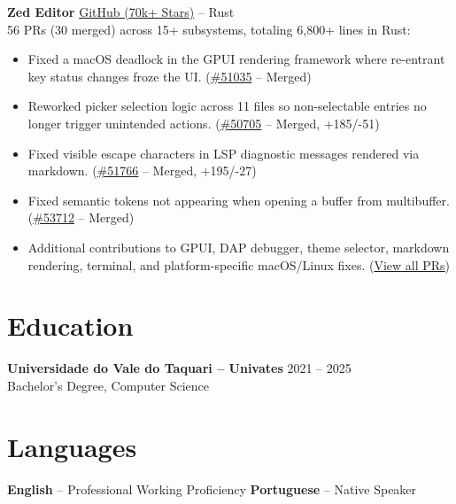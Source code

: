 \documentclass[10pt,a4paper]{article}
\begin{document}
\vspace{2pt}
\noindent\textbf{\footnotesize Zed Editor} \textbullet{} {\footnotesize\href{https://github.com/zed-industries/zed}{GitHub (70k+ Stars)} -- Rust}\\
{\footnotesize 56 PRs (30 merged) across 15+ subsystems, totaling 6,800+ lines in Rust:}
\begin{itemize}
    \item {\footnotesize Fixed a macOS deadlock in the GPUI rendering framework where re-entrant key status changes froze the UI. (\href{https://github.com/zed-industries/zed/pull/51035}{\#51035} -- Merged)}
    \item {\footnotesize Reworked picker selection logic across 11 files so non-selectable entries no longer trigger unintended actions. (\href{https://github.com/zed-industries/zed/pull/50705}{\#50705} -- Merged, +185/-51)}
    \item {\footnotesize Fixed visible escape characters in LSP diagnostic messages rendered via markdown. (\href{https://github.com/zed-industries/zed/pull/51766}{\#51766} -- Merged, +195/-27)}
    \item {\footnotesize Fixed semantic tokens not appearing when opening a buffer from multibuffer. (\href{https://github.com/zed-industries/zed/pull/53712}{\#53712} -- Merged)}
    \item {\footnotesize Additional contributions to GPUI, DAP debugger, theme selector, markdown rendering, terminal, and platform-specific macOS/Linux fixes. (\href{https://github.com/zed-industries/zed/pulls?q=author\%3ADnreikronos}{View all PRs})}
\end{itemize}

\section{Education}

\vspace{2pt}
\noindent\textbf{\footnotesize Universidade do Vale do Taquari -- Univates} \hfill {\footnotesize 2021 -- 2025}\\
{\footnotesize Bachelor's Degree, Computer Science}

\section{Languages}

\vspace{2pt}
\begin{center}
{\footnotesize \textbf{English} -- Professional Working Proficiency \quad\quad \textbf{Portuguese} -- Native Speaker}
\end{center}
\end{document}
